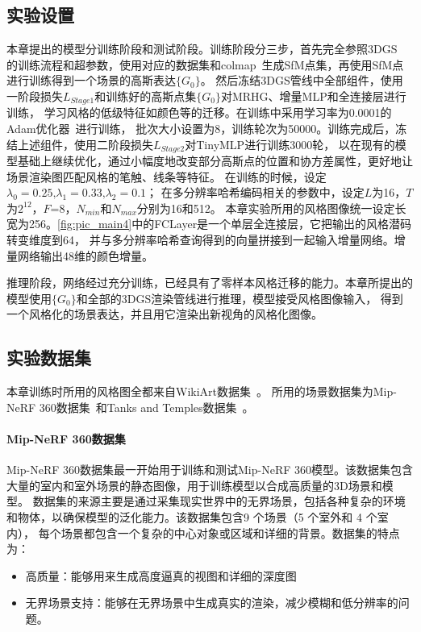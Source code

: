\subsection{实验设置}
本章提出的模型分训练阶段和测试阶段。训练阶段分三步，首先完全参照3DGS~\cite{kerbl20233d}
的训练流程和超参数，使用对应的数据集和colmap~\cite{schoenberger2016sfm}生成SfM点集，再使用SfM点进行训练得到一个场景的高斯表达$\{G_0\}$。
然后冻结3DGS管线中全部组件，使用一阶段损失$L_{Stage1}$和训练好的高斯点集$\{G_0\}$对MRHG、增量MLP和全连接层进行训练，
学习风格的低级特征如颜色等的迁移。在训练中采用学习率为0.0001的Adam优化器~\cite{diederik2014adam}进行训练，
批次大小设置为8，训练轮次为50000。训练完成后，冻结上述组件，使用二阶段损失$L_{Stage2}$对TinyMLP进行训练3000轮，
以在现有的模型基础上继续优化，通过小幅度地改变部分高斯点的位置和协方差属性，更好地让场景渲染图匹配风格的笔触、线条等特征。
在训练的时候，设定\(\lambda_0=0.25\text{,}\lambda_1=0.33\text{,}\lambda_2=0.1\)；
在多分辨率哈希编码相关的参数中，设定$L$为16，$T$为$2^{12}$，$F$=8，$N_{min}$和$N_{max}$分别为16和512。
本章实验所用的风格图像统一设定长宽为256。\autoref{fig:pic_main4}中的FCLayer是一个单层全连接层，它把输出的风格潜码转变维度到64，
并与多分辨率哈希查询得到的向量拼接到一起输入增量网络。增量网络输出48维的颜色增量。
\par 推理阶段，网络经过充分训练，已经具有了零样本风格迁移的能力。本章所提出的模型使用$\{G_0\}$和全部的3DGS渲染管线进行推理，模型接受风格图像输入，
得到一个风格化的场景表达，并且用它渲染出新视角的风格化图像。
\subsection{实验数据集}
本章训练时所用的风格图全都来自WikiArt数据集~\cite{wikiart2018}。
所用的场景数据集为Mip-NeRF 360数据集~\cite{barron2022mip}和Tanks and Temples数据集~\cite{knapitsch2017tanks}。
\paragraph{Mip-NeRF 360数据集}
Mip-NeRF 360数据集最一开始用于训练和测试Mip-NeRF 360模型。该数据集包含大量的室内和室外场景的静态图像，用于训练模型以合成高质量的3D场景和模型。
数据集的来源主要是通过采集现实世界中的无界场景，包括各种复杂的环境和物体，以确保模型的泛化能力‌。该数据集包含9 个场景（5 个室外和 4 个室内），
每个场景都包含一个复杂的中心对象或区域和详细的背景。数据集的特点为：
\begin{itemize}
    \item 高质量：能够用来生成高度逼真的视图和详细的深度图
    \item 无界场景支持‌：能够在无界场景中生成真实的渲染，减少模糊和低分辨率的问题。
\end{itemize}
